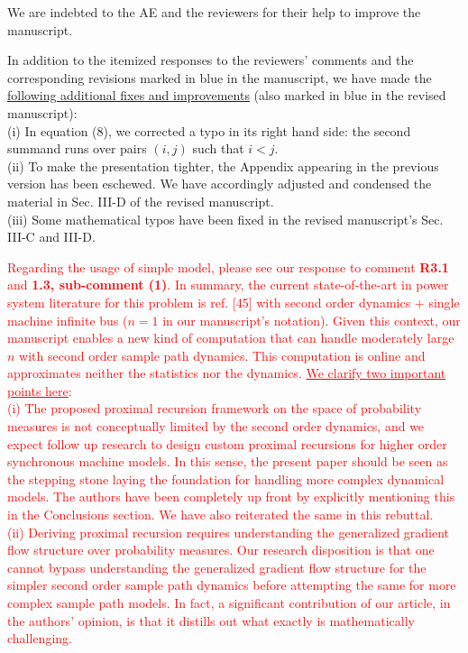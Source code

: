 \documentclass[12pt,onecolumn]{IEEEtran}
\newcommand{\blue}{\color{blue}}
\newcommand{\red}{\textcolor{red}}
\newcommand{\nib}{\noindent  {\bf Response:} }
\begin{document}
{\nib {\blue We are indebted to the AE and the reviewers for their help to improve the manuscript.

In addition to the itemized responses to the reviewers' comments and the corresponding revisions marked in blue in the manuscript, we have made the \ul{following additional fixes and improvements} (also marked in blue in the revised manuscript):\\
(i) In equation (8), we corrected a typo in its right hand side: the second summand runs over pairs $(i,j)$ such that $i<j$.\\
(ii) To make the presentation tighter, the Appendix appearing in the previous version has been eschewed. We have accordingly adjusted and condensed the material in Sec. III-D of the revised manuscript.\\
(iii) Some mathematical typos have been fixed in the revised manuscript's Sec. III-C and III-D.

{\red{Regarding the usage of simple model, please see our response to comment \textbf{R3.1} and \textbf{1.3, sub-comment (1)}. In summary, the current state-of-the-art in power system literature for this problem is ref. [45] with second order dynamics + single machine infinite bus ($n=1$ in our manuscript's notation). Given this context, our manuscript enables a new kind of computation that can handle moderately large $n$ with second order sample path dynamics. This computation is online and approximates neither the statistics nor the dynamics.  \ul{We clarify two important points here}:\\(i) The proposed proximal recursion framework on the space of probability measures is not conceptually limited by the second order dynamics, and we expect follow up research to design custom proximal recursions for higher order synchronous machine models. In this sense, the present paper should be seen as the stepping stone laying the foundation for handling more complex dynamical models. The authors have been completely up front by explicitly mentioning this in the Conclusions section. We have also reiterated the same in this rebuttal.\\(ii) Deriving proximal recursion requires understanding the generalized gradient flow structure over probability measures. Our research disposition is that one cannot bypass understanding the generalized gradient flow structure for the simpler second order sample path dynamics before attempting the same for more complex sample path models. In fact, a significant contribution of our article, in the authors' opinion, is that it distills out what exactly is mathematically challenging.}} 
}}
\end{document}
